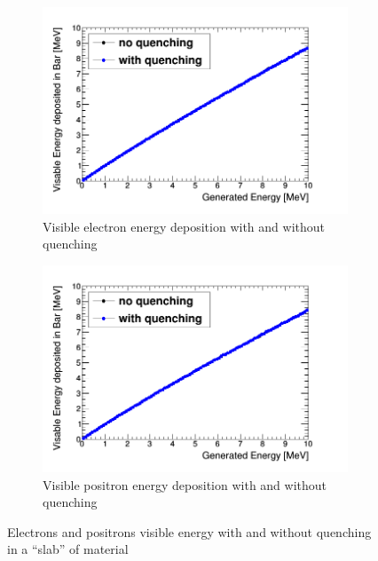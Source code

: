 \begin{figure}[H]
\centering
\begin{subfigure}{.5\textwidth}
  \centering
  \includegraphics[width=\linewidth]{quench_eng_LinElectrons.png}
  \captionsetup{width=.9\linewidth}
  \caption{Visible electron energy deposition with and without quenching}
  \label{subFig:electron_quenched_and_not}
\end{subfigure}%
\begin{subfigure}{.5\textwidth}
  \centering
  \includegraphics[width=\linewidth]{quench_eng_LinPositrons.png}
  \captionsetup{width=.9\linewidth}
  \caption{Visible positron energy deposition with and without quenching}
  \label{subFig:positron_quenched_and_not}
\end{subfigure}
\caption{Electrons and positrons visible energy with and without quenching in a ``slab'' of material}
\label{fig:electron_positron_quenched_and_not}
\end{figure}


